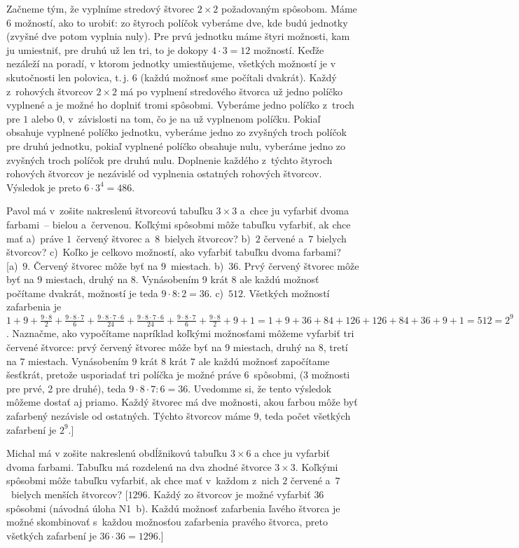 {%
Začneme tým, že vyplníme stredový štvorec $2\times 2$ požadovaným
spôsobom. Máme $6$ možností, ako to urobiť: zo štyroch políčok vyberáme dve, kde budú jednotky (zvyšné dve potom vyplnia nuly). Pre prvú jednotku máme štyri možnosti, kam ju umiestniť, pre druhú už len tri, to je dokopy $4\cdot 3=12$ možností. Keďže nezáleží na poradí, v ktorom jednotky umiestňujeme, všetkých možností je v skutočnosti len polovica, t.\,j. $6$ (každú možnosť sme počítali dvakrát). Každý z~rohových štvorcov $2\times 2$ má po vyplnení stredového štvorca už jedno políčko vyplnené a je možné ho doplniť tromi spôsobmi.
Vyberáme jedno políčko z~troch pre $1$ alebo $0$, v~závislosti na tom, čo je na už vyplnenom políčku. Pokiaľ obsahuje vyplnené políčko jednotku, vyberáme jedno zo zvyšných troch políčok pre druhú jednotku, pokiaľ vyplnené políčko obsahuje nulu, vyberáme jedno zo zvyšných troch políčok pre druhú nulu. Doplnenie každého z~týchto štyroch rohových štvorcov je nezávislé od vyplnenia ostatných rohových štvorcov. Výsledok je preto $6\cdot 3^4=486$.


Pavol má v~zošite nakreslenú štvorcovú tabuľku $3\times 3$ a~chce ju vyfarbiť dvoma farbami~-- bielou a~červenou. Koľkými spôsobmi môže tabuľku vyfarbiť, ak chce mať
a)~práve $1$~červený štvorec a~$8$~bielych štvorcov?
b)~$2$ červené a~$7$ bielych štvorcov?
c)~Koľko je celkovo možností, ako vyfarbiť tabuľku dvoma farbami? [a)~$9$. Červený štvorec môže byť na $9$~miestach.
b)~$36$. Prvý červený štvorec môže byť na $9$ miestach, druhý na $8$.
Vynásobením 9 krát 8 ale každú možnosť počítame dvakrát, možností je teda $9\cdot 8:2=36$.
c)~$512$. Všetkých možností zafarbenia je $1+9+\frac{9 \cdot 8}{2}+\frac{9 \cdot 8 \cdot 7}{6}+\frac{9 \cdot 8 \cdot 7\cdot6}{24 } +\frac{9 \cdot 8 \cdot 7\cdot6}{24}+\frac{9 \cdot 8 \cdot 7}{6}+ \frac{9 \cdot 8}{2} +9+1 = 1+9+36+84+126+126+84+36+9+1 = 512 = 2^9$. Naznačme, ako vypočítame napríklad koľkými možnosťami môžeme vyfarbiť tri červené štvorce: prvý červený štvorec môže byť na $9$ miestach, druhý na $8$, tretí na $7$ miestach.
Vynásobením $9$ krát $8$ krát $7$ ale každú možnosť započítame šesťkrát, pretože usporiadať tri políčka je možné práve 6~spôsobmi, (3 možnosti pre prvé, 2 pre druhé), teda $9\cdot 8\cdot 7:6=36$. Uvedomme si, že tento výsledok môžeme dostať aj priamo. Každý štvorec má dve možnosti, akou farbou môže byť zafarbený nezávisle od ostatných. Týchto štvorcov máme 9, teda počet všetkých zafarbení je $2^9$.]

Michal má v zošite nakreslenú obdĺžnikovú tabuľku $3\times 6$ a chce ju vyfarbiť dvoma farbami. Tabuľku má rozdelenú na dva zhodné štvorce $3\times 3$. Koľkými spôsobmi môže tabuľku vyfarbiť, ak chce mať v~každom z~nich $2$ červené a~$7$~bielych menších štvorcov? [$1296$. Každý zo štvorcov je možné vyfarbiť $36 $ spôsobmi (návodná úloha N1~b). Každú možnosť zafarbenia ľavého štvorca je možné skombinovať s~každou možnosťou zafarbenia pravého štvorca, preto všetkých zafarbení je $36\cdot 36=1296$.]

}

